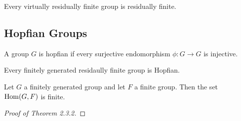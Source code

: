 \begin{propn}
  Every virtually residually finite group is residually finite.
\end{propn}

\subsection{Hopfian Groups}

\begin{defn}
  A group $G$ is hopfian if every surjective endomorphism $\phi: G\to G$  is
  injective.
\end{defn}

\begin{thm}
  Every finitely generated residaully finite group is Hopfian.
\end{thm}
\begin{lemma}
 Let $G$ a finitely generated group and let $F$ a finite group. Then the set
 $\operatorname{Hom}(G, F)$ is finite. 
\end{lemma}

\begin{proof}[Proof of Theorem 2.3.2]
  
\end{proof}

